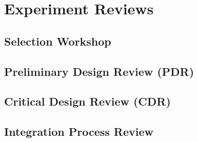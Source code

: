 \newpage
\section{Experiment Reviews}
\subsection{Selection Workshop}
\subsection{Preliminary Design Review (PDR)}
\subsection{Critical Design Review (CDR)}
\subsection{Integration Process Review}